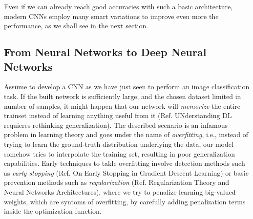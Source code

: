 \documentclass[LaM,binding=0.6cm]{./packages/sapthesis/sapthesis}
\begin{document}
            Even if we can already reach good accuracies with such a basic architecture, modern CNNs employ many smart variations to improve even more the performance,
            as we shall see in the next section. 

        \subsection{From Neural Networks to Deep Neural Networks}
        Assume to develop a CNN as we have just seen to perform an image classification task. If the built network is sufficiently large, and the chosen dataset limited
        in number of samples, it might happen that our network will \textit{memorize} the entire trainset instead of learning anything useful from it (Ref. 
        UNderstanding DL requieres rethinking generalization). The described scenario is an infamous problem in learning theory and goes under the name of \textit{overfitting},
        i.e., instead of trying to learn the ground-truth distribution underlying the data, our model somehow tries to interpolate the training set, 
        resulting in poor generalization capabilities. 
        Early techniques to takle overfitting involve detection methods such as \textit{early stopping} (Ref. On Early Stopping in Gradient Descent Learning) 
        or basic prevention methods such as \textit{regularization} (Ref. Regularization Theory and Neural Networks Architectures),
        where we try to penalize learning big-valued weights, which are syntoms of overfitting, by carefully adding penalization terms inside the optimization function.
\end{document}
